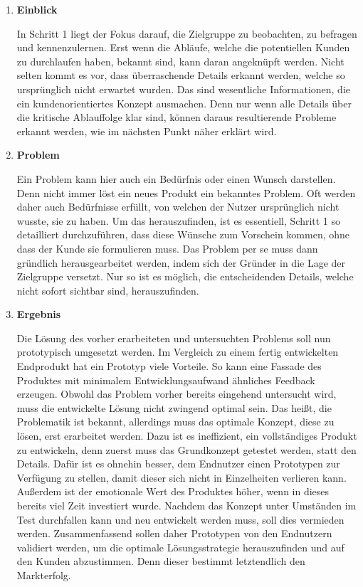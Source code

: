 \begin{enumerate}
	\item \textbf{Einblick}
	
	In Schritt 1 liegt der Fokus darauf, die Zielgruppe zu beobachten, zu befragen und kennenzulernen. Erst wenn die Abläufe, welche die potentiellen Kunden zu durchlaufen haben, bekannt sind, kann daran angeknüpft werden. Nicht selten kommt es vor, dass überraschende Details erkannt werden, welche so ursprünglich nicht erwartet wurden. Das sind wesentliche Informationen, die ein kundenorientiertes Konzept ausmachen. Denn nur wenn alle Details über die kritische Ablauffolge klar sind, können daraus resultierende Probleme erkannt werden, wie im nächsten Punkt näher erklärt wird. 
	
	\item \textbf{Problem}
	
	Ein Problem kann hier auch ein Bedürfnis oder einen Wunsch darstellen. Denn nicht immer löst ein neues Produkt ein bekanntes Problem. Oft werden daher auch Bedürfnisse erfüllt, von welchen der Nutzer ursprünglich nicht wusste, sie zu haben. Um das herauszufinden, ist es essentiell, Schritt 1 so detailliert durchzuführen, dass diese Wünsche zum Vorschein kommen, ohne dass der Kunde sie formulieren muss. Das Problem per se muss dann gründlich herausgearbeitet werden, indem sich der Gründer in die Lage der Zielgruppe versetzt. Nur so ist es möglich, die entscheidenden Details, welche nicht sofort sichtbar sind, herauszufinden.
	
	\item \textbf{Ergebnis}
	
	Die Lösung des vorher erarbeiteten und untersuchten Problems soll nun prototypisch umgesetzt werden. Im Vergleich zu einem fertig entwickelten Endprodukt hat ein Prototyp viele Vorteile. So kann eine Fassade des Produktes mit minimalem Entwicklungsaufwand ähnliches Feedback erzeugen. Obwohl das Problem vorher bereits eingehend untersucht wird, muss die entwickelte Lösung nicht zwingend optimal sein. Das heißt, die Problematik ist bekannt, allerdings muss das optimale Konzept, diese zu lösen, erst erarbeitet werden. Dazu ist es ineffizient, ein vollständiges Produkt zu entwickeln, denn zuerst muss das Grundkonzept getestet werden, statt den Details. Dafür ist es ohnehin besser, dem Endnutzer einen Prototypen zur Verfügung zu stellen, damit dieser sich nicht in Einzelheiten verlieren kann. Außerdem ist der emotionale Wert des Produktes höher, wenn in dieses bereits viel Zeit investiert wurde. Nachdem das Konzept unter Umständen im Test durchfallen kann und neu entwickelt werden muss, soll dies vermieden werden. Zusammenfassend sollen daher Prototypen von den Endnutzern validiert werden, um die optimale Lösungsstrategie herauszufinden und auf den Kunden abzustimmen. Denn dieser bestimmt letztendlich den Markterfolg.
	

\end{enumerate}
